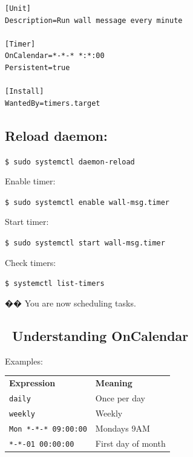 \documentclass[12pt]{article}
\begin{document}
\begin{highlightbox}
\begin{verbatim}
[Unit]
Description=Run wall message every minute

[Timer]
OnCalendar=*-*-* *:*:00
Persistent=true

[Install]
WantedBy=timers.target
\end{verbatim}
\end{highlightbox}

\subsection*{Reload daemon:}

\begin{highlightbox}
\texttt{\$ sudo systemctl daemon-reload}
\end{highlightbox}

Enable timer:

\begin{highlightbox}
\texttt{\$ sudo systemctl enable wall-msg.timer}
\end{highlightbox}

Start timer:

\begin{highlightbox}
\texttt{\$ sudo systemctl start wall-msg.timer}
\end{highlightbox}

Check timers:

\begin{highlightbox}
\texttt{\$ systemctl list-timers}
\end{highlightbox}

\begin{infobox}
�� You are now scheduling tasks.
\end{infobox}

\subsection*{\faCalendar\ Understanding OnCalendar}

Examples:

\begin{infobox}
\begin{tabular}{ll}
\textbf{Expression} & \textbf{Meaning} \\
\texttt{daily} & Once per day \\
\texttt{weekly} & Weekly \\
\texttt{Mon *-*-* 09:00:00} & Mondays 9AM \\
\texttt{*-*-01 00:00:00} & First day of month \\
\end{tabular}
\end{infobox}
\end{document}
